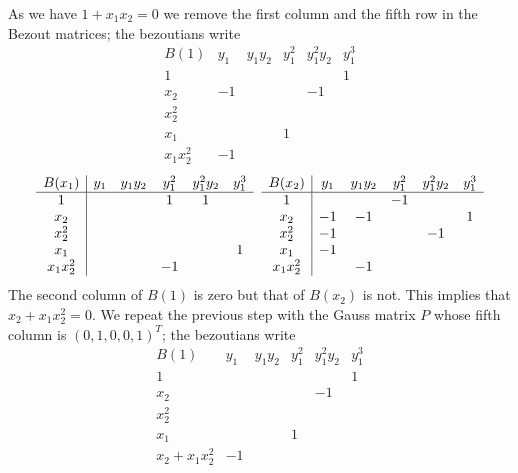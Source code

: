 \documentclass{standalone}
\begin{document}
As we have $1 + x_1x_2 = 0$ we remove the first column and the fifth row in the Bezout matrices; the bezoutians write
$$
\begin{array}{c|ccccc}
	B(1) & y_1 & y_1y_2 & y_1^2 & y_1^2y_2 & y_1^3 \\
	\hline
	1  &  &  &  &  & 1 \\
	x_2  & -1 &  &  & -1 & \\
	x_2^2  &  &  &  &  & \\
	x_1  &  &  & 1 &  & \\
	x_1x_2^2  & -1 &  &  &  &
\end{array}$$
$$
\begin{array}{c|ccccc}
	B(x_1)  & y_1 & y_1y_2 & y_1^2 & y_1^2y_2 & y_1^3 \\
	\hline
	1  &  &  & 1 & 1 & \\
	x_2  &  &  &  &  & \\
	x_2^2  &  &  &  &  & \\
	x_1  &  &  &  &  & 1 \\
	x_1x_2^2  &  &  & -1 &  &
\end{array}
\hspace{0.2cm}
\begin{array}{c|ccccc}
	B(x_2) & y_1 & y_1y_2 & y_1^2 & y_1^2y_2 & y_1^3 \\
	\hline
	1  &  &  & -1 &  & \\
	x_2  & -1 & -1 &  &  & 1 \\
	x_2^2  & -1 &  &  & -1 & \\
	x_1  & -1 &  &  &  & \\
	x_1x_2^2 &  & -1 &  &  &
\end{array}
$$
The second column of $B(1)$ is zero but that of $B(x_2)$ is not. This implies that $x_2 + x_1x_2^{2} = 0$. We repeat the previous step with the Gauss matrix $P$ whose fifth column is $(0, 1, 0, 0, 1)^{T}$; the bezoutians write
$$
\begin{array}{c|ccccc}
	B(1) & y_1 & y_1y_2 & y_1^2 & y_1^2y_2 & y_1^3 \\
	\hline
	1  &  &  &  &  & 1 \\
	x_2  &  &  &  & -1 & \\
	x_2^2  &  &  &  &  & \\
	x_1  &  &  & 1 &  & \\
	x_2 + x_1x_2^2  & -1 &  &  &  &
\end{array}$$
\end{document}
